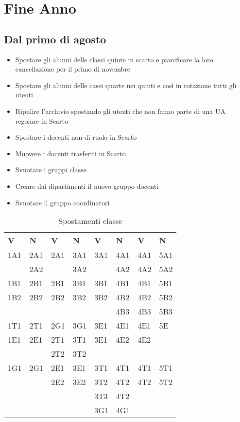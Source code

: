 \chapter{Fine Anno}
\section{Dal primo di agosto}
\begin{itemize}
	\item Spostare gli alunni delle classi quinte in scarto e pianificare la loro cancellazione per il primo di novembre
	\item Spostare gli alunni delle cassi quarte nei quinti e così in rotazione tutti gli utenti
	\item Ripulire l'archivio spostando gli utenti che non fanno parte di una UA regolare in Scarto
	\item Spostare i docenti non di ruolo in Scarto
	\item Muovere i docenti trasferiti in Scarto
	\item Svuotare i gruppi classe
	\item Creare dai dipartimenti il nuovo gruppo docenti
	\item Svuotare il gruppo coordinatori
\end{itemize}
\begin{table}
	\centering
	\begin{tabular}{llllllll}
\toprule
V	& N & V & N & V &N  &V  &N  \\
\midrule
1A1	& 2A1 & 2A1 &3A1  & 3A1 & 4A1 & 4A1 &  5A1\\
	& 2A2 &  &3A2  &  & 4A2 & 4A2 &  5A2\\
1B1	& 2B1 & 2B1 &3B1  & 3B1 & 4B1 & 4B1 &  5B1\\
1B2	& 2B2 & 2B2 &3B2  &  3B2 & 4B2 & 4B2 &  5B2\\
	&     &     &     &     & 4B3 & 4B3 &  5B3\\
1T1	& 2T1    &  2G1   &  3G1   &  3E1   & 4E1 & 4E1 &  5E\\
1E1	& 2E1    & 2T1    & 3T1    &  3E1  & 4E2 & 4E2 &  \\
  	&        & 2T2    & 3T2    &     & &  &  \\
1G1	&   2G1     & 2E1    & 3E1    &3T1     &4T1 & 4T1 & 5T1 \\
	&        & 2E2    & 3E2    & 3T2    & 4T2& 4T2 & 5T2 \\
	&        &   &    & 3T3    & 4T2&  &  \\
	&        &   &    &  3G1    & 4G1&  &  \\	
\bottomrule
\end{tabular}
	\caption{Spostamenti classe}
\end{table}